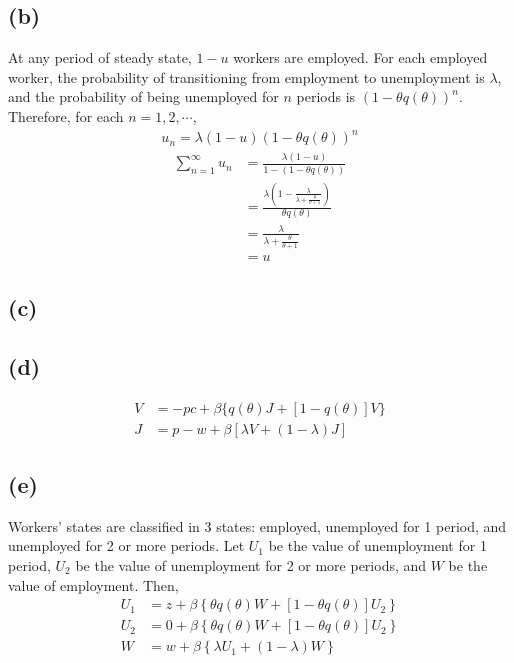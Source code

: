 \documentclass{ltjsarticle}
\begin{document}
\subsection*{(b)}
At any period of steady state, $1-u$ workers are employed. For each employed worker, the probability of transitioning from employment to unemployment is $\lambda$, and the probability of being unemployed for $n$ periods is $(1- \theta q(\theta))^n$. Therefore, for each $n=1,2,\cdots$, 
\begin{gather*}
  u_n = \lambda (1-u) (1- \theta q(\theta))^n
\end{gather*}
\begin{align*}
  \sum_{n=1}^{\infty} u_n
  &= \frac{\lambda (1-u)}{1 - (1- \theta q(\theta))}\\
  &= \frac{\lambda \left(1-\frac{\lambda}{\lambda + \frac{\theta}{\theta+1}}\right)}{\theta q(\theta)}\\
  &= \frac{\lambda}{\lambda + \frac{\theta}{\theta+1}}\\
  &= u
\end{align*}

\subsection*{(c)}

\subsection*{(d)}

\begin{align*}
  V &= -pc + \beta \{q(\theta)J + [1-q(\theta)]V \}\\
  J &= p - w + \beta[\lambda V + (1-\lambda)J]
\end{align*}

\subsection*{(e)}

Workers' states are classified in 3 states: employed, unemployed for 1 period, and unemployed for 2 or more periods. 
Let $U_1$ be the value of unemployment for 1 period, $U_2$ be the value of unemployment for 2 or more periods, and $W$ be the value of employment. Then,
\begin{align*}
  U_1 &= z + \beta \left\{ \theta q(\theta) W + [1-\theta q(\theta)] U_2 \right\}\\
  U_2 &= 0 + \beta \left\{ \theta q(\theta) W + [1-\theta q(\theta)] U_2 \right\}\\
  W &= w + \beta \left\{\lambda U_1 + (1-\lambda) W \right\}
\end{align*}
\end{document}
